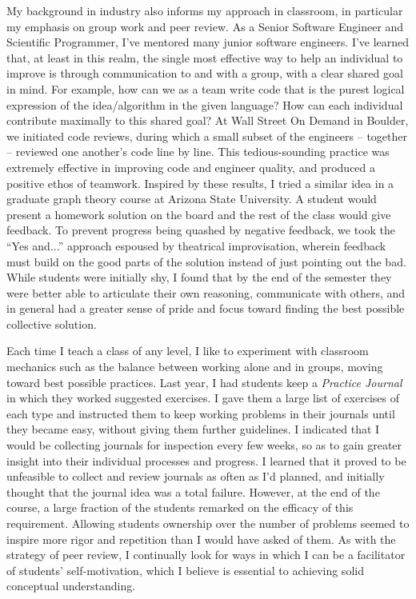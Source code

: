 \documentclass[12pt]{article}
\begin{document}
My background in industry also informs my approach in classroom, in particular my emphasis on group work and peer review. As a Senior Software Engineer and Scientific Programmer,
I've mentored many junior software engineers. I've learned that, at least in this realm, the single most effective way to help an individual to improve is through communication to 
and with a group, with a clear shared goal in mind. For example, how can we as a team write code that is the purest logical expression of the idea/algorithm in the given language? 
How can each individual contribute maximally to this shared goal? At Wall Street On Demand in Boulder, we initiated code reviews, during which a small subset of the 
engineers -- together -- reviewed one another's code line by line. This tedious-sounding practice was extremely effective in improving code and engineer quality, 
and produced a positive ethos of teamwork. Inspired by these results, I tried a similar idea in a graduate graph theory course at Arizona State University. 
A student would present a homework solution on the board and the rest of the class would give feedback. To prevent progress being quashed by negative feedback, 
we took the ``Yes and...'' approach espoused by theatrical improvisation, wherein feedback must build on the
good parts of the solution instead of just pointing out the bad. While students were initially shy, I found that by the end of the semester they were better 
able to articulate their own reasoning, communicate with others, and in general had a greater sense of pride and focus toward finding the best possible collective solution. 

Each time I teach a class of any level, I like to experiment with classroom mechanics such as the balance between working alone and in groups, moving toward 
best possible practices. Last year, I had students keep a \emph{Practice Journal} in which they worked suggested exercises. I gave them a large list of exercises of 
each type and instructed them to keep working problems in their journals until they became easy, without giving them further guidelines. I indicated that I would 
be collecting journals for inspection every few weeks, so as to gain greater insight into their individual processes and progress. I learned that it proved to be 
unfeasible to collect and review journals as often as I'd planned, and initially thought that the journal idea was a total failure. However, at the end of the course, 
a large fraction of the students remarked on the efficacy of this requirement.  Allowing students ownership over the number of problems seemed to inspire more rigor and 
repetition than I would have asked of them. As with the strategy of peer review, I continually look for ways in which I can be a facilitator of students' self-motivation, 
which I believe is essential to achieving solid conceptual understanding. 
\end{document}
